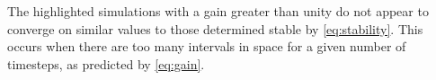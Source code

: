 \documentclass[a4paper,12pt,twocolumn]{article}
\begin{document}
The highlighted simulations with a gain greater than unity do not appear to
converge on similar values to those determined stable by \eqref{eq:stability}.
This occurs when there are too many intervals in space for a given number of
timesteps, as predicted by \eqref{eq:gain}.

\printbibliography
\end{document}
